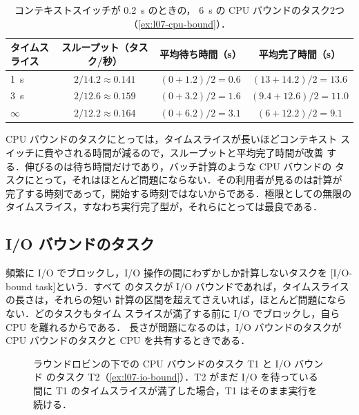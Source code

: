 \documentclass[../main.tex]{subfiles}
\begin{document}
\begin{table}[htbp]
  \centering
  \caption{コンテキストスイッチが \SI{0.2}{\second} のときの，
    \SI{6}{\second} の CPU バウンドのタスク2つ
    （\cref{ex:l07-cpu-bound}）．}
  \label{tab:l07-cpu-bound}
  \small
  \begin{tabular}{@{}lccc@{}}
    \toprule
    タイムスライス & スループット（タスク/秒） & 平均待ち時間（s） &
      平均完了時間（s） \\
    \midrule
    \SI{1}{\second}  & $2/14.2 \approx 0.141$ & $(0+1.2)/2 = 0.6$ & $(13+14.2)/2 = 13.6$ \\
    \SI{3}{\second}  & $2/12.6 \approx 0.159$ & $(0+3.2)/2 = 1.6$ & $(9.4+12.6)/2 = 11.0$ \\
    $\infty$         & $2/12.2 \approx 0.164$ & $(0+6.2)/2 = 3.1$ & $(6+12.2)/2 = 9.1$ \\
    \bottomrule
  \end{tabular}
\end{table}

CPU バウンドのタスクにとっては，タイムスライスが長いほどコンテキスト
スイッチに費やされる時間が減るので，スループットと平均完了時間が改善
する．伸びるのは待ち時間だけであり，バッチ計算のような CPU バウンドの
タスクにとって，それはほとんど問題にならない．その利用者が見るのは計算が
完了する時刻であって，開始する時刻ではないからである．極限としての無限の
タイムスライス，すなわち実行完了型が，それらにとっては最良である．

\subsection{I/O バウンドのタスク}

頻繁に I/O でブロックし，I/O 操作の間にわずかしか計算しないタスクを
[I/O-bound task]という．すべて
のタスクが I/O バウンドであれば，タイムスライスの長さは，それらの短い
計算の区間を超えてさえいれば，ほとんど問題にならない．どのタスクもタイム
スライスが満了する前に I/O でブロックし，自ら CPU を離れるからである．
長さが問題になるのは，I/O バウンドのタスクが CPU バウンドのタスクと CPU
を共有するときである．

\begin{figure}[htbp]
  \centering
  
  \caption{ラウンドロビンの下での CPU バウンドのタスク T1 と I/O バウンド
    のタスク T2（\cref{ex:l07-io-bound}）．T2 がまだ I/O を待っている間に
    T1 のタイムスライスが満了した場合，T1 はそのまま実行を続ける．}
  \label{fig:l07-io-timeslice}
\end{figure}
\end{document}
